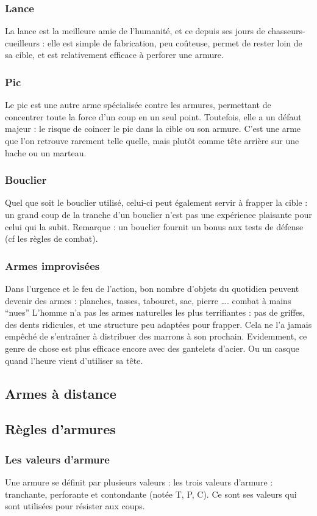 \documentclass[10pt,a4paper,twocolumn]{book}
\begin{document}
\subsubsection{Lance}
La lance est la meilleure amie de l’humanité, et ce depuis ses jours de chasseurs-cueilleurs : elle est simple de fabrication, peu coûteuse, permet de rester loin de sa cible, et est relativement efficace à perforer une armure.
\subsubsection{Pic}
Le pic est une autre arme spécialisée contre les armures, permettant de concentrer toute la force d’un coup en un seul point. Toutefois, elle a un défaut majeur : le risque de coincer le pic dans la cible ou son armure. C’est une arme que l’on retrouve rarement telle quelle, mais plutôt comme tête arrière sur une hache ou un marteau.
\subsubsection{Bouclier}
Quel que soit le bouclier utilisé, celui-ci peut également servir à frapper la cible : un grand coup de la tranche d’un bouclier n’est pas une expérience plaisante pour celui qui la subit. Remarque : un bouclier fournit un bonus aux tests de défense (cf les règles de combat).
\subsubsection{Armes improvisées}
Dans l’urgence et le feu de l’action, bon nombre d’objets du quotidien peuvent devenir des armes : planches, tasses, tabouret, sac, pierre ….
combat à mains “nues”
L’homme n’a pas les armes naturelles les plus terrifiantes : pas de griffes, des dents ridicules, et une structure peu adaptées pour frapper. Cela ne l’a jamais empêché de s'entraîner à distribuer des marrons à son prochain. Evidemment, ce genre de chose est plus efficace encore avec des gantelets d’acier. Ou un casque quand l’heure vient d’utiliser sa tête.
\subsection{Armes à distance}
\subsection{Règles d’armures}
\subsubsection{Les valeurs d'armure}
Une armure se définit par plusieurs valeurs :  les trois valeurs d’armure : tranchante, perforante et contondante (notée T, P, C). Ce sont ses valeurs qui sont utilisées pour résister aux coups. 
\end{document}

